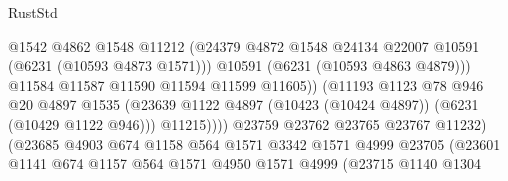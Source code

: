 \begin{lexlean}{RustStd}
\begin{coremodule}
{{                                          @1542
                                          @4862
                                          @1548
                                          @11212
                                          (@24379
                                            @4872
                                            @1548
                                            @24134
                                            @22007
                                            @10591
                                            (@6231 (@10593 @4873 @1571)))
                                          @10591
                                          (@6231 (@10593 @4863 @4879)))
                                        @11584
                                        @11587
                                        @11590
                                        @11594
                                        @11599
                                        @11605))
                                    (@11193
                                      @1123
                                      @78
                                      @946
                                      @20
                                      @4897
                                      @1535
                                      (@23639
                                        @1122
                                        @4897
                                        (@10423 (@10424 @4897))
                                        (@6231 (@10429 @1122 @946)))
                                      @11215))))
                              @23759
                              @23762
                              @23765
                              @23767
                              @11232)
                            (@23685
                              @4903
                              @674
                              @1158
                              @564
                              @1571
                              @3342
                              @1571
                              @4999
                              @23705
                              (@23601
                                @1141
                                @674
                                @1157
                                @564
                                @1571
                                @4950
                                @1571
                                @4999
                                (@23715
                                  @1140
                                  @1304
}}
\end{coremodule}
\end{lexlean}
